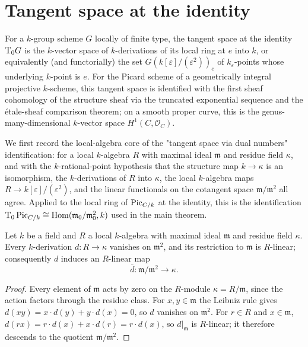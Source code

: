 \section{Tangent space at the identity}
\label{sec:pic0_tangent_space}

For a \(k\)-group scheme \(G\) locally of finite type, the tangent
space at the identity \(\textup T_0 G\) is the \(k\)-vector space of
\(k\)-derivations of its local ring at \(e\) into \(k\), or
equivalently (and functorially) the set
\(G(k[\varepsilon]/(\varepsilon^2))_e\) of \(k_\varepsilon\)-points
whose underlying \(k\)-point is \(e\). For the Picard scheme of a
geometrically integral projective \(k\)-scheme, this tangent space is
identified with the first sheaf cohomology of the structure sheaf via
the truncated exponential sequence and the étale-sheaf comparison
theorem; on a smooth proper curve, this is the genus-many-dimensional
\(k\)-vector space \(H^1(C, \mathcal{O}_C)\).

We first record the local-algebra core of the "tangent space via dual
numbers" identification: for a local \(k\)-algebra \(R\) with maximal
ideal \(\mathfrak m\) and residue field \(\kappa\), and with the
\(k\)-rational-point hypothesis that the structure map
\(k \to \kappa\) is an isomorphism, the \(k\)-derivations of \(R\)
into \(\kappa\), the local \(k\)-algebra maps
\(R \to k[\varepsilon]/(\varepsilon^2)\), and the linear functionals
on the cotangent space \(\mathfrak m/\mathfrak m^2\) all agree.
Applied to the local ring of \(\operatorname{Pic}_{C/k}\) at the identity, this is
the identification \(\textup T_0 \operatorname{Pic}_{C/k} \cong
\operatorname{Hom}(\mathfrak m_0/\mathfrak m_0^2, k)\) used in the main theorem.

\begin{lemma}\leanok
  \label{lem:tangent_derivation_descends}
  Let \(k\) be a field and \(R\) a local \(k\)-algebra with maximal
  ideal \(\mathfrak m\) and residue field \(\kappa\). Every
  \(k\)-derivation \(d : R \to \kappa\) vanishes on
  \(\mathfrak m^2\), and its restriction to \(\mathfrak m\) is
  \(R\)-linear; consequently \(d\) induces an \(R\)-linear map
  \[
    \bar d : \mathfrak m/\mathfrak m^2 \longrightarrow \kappa .
  \]
\end{lemma}

\begin{proof}\leanok
  Every element of \(\mathfrak m\) acts by zero on the \(R\)-module
  \(\kappa = R/\mathfrak m\), since the action factors through the
  residue class. For \(x, y \in \mathfrak m\) the Leibniz rule gives
  \(d(xy) = x \cdot d(y) + y \cdot d(x) = 0\), so \(d\) vanishes on
  \(\mathfrak m^2\). For \(r \in R\) and \(x \in \mathfrak m\),
  \(d(rx) = r \cdot d(x) + x \cdot d(r) = r \cdot d(x)\), so
  \(d|_{\mathfrak m}\) is \(R\)-linear; it therefore descends to the
  quotient \(\mathfrak m/\mathfrak m^2\).
\end{proof}

